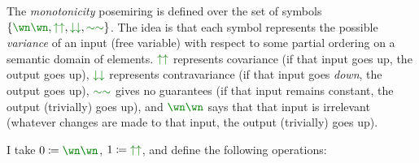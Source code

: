 \begin{example}\label{def:monotonicity-posemiring}
  The \emph{monotonicity} posemiring is defined over the set of symbols
  $\{\gr{\wn\wn}, \gr{\uparrow\uparrow}, \gr{\downarrow\downarrow},
  \gr{\sim\sim}\}$.
  The idea is that each symbol represents the possible \emph{variance} of an
  input (free variable) with respect to some partial ordering on a semantic
  domain of elements.
  $\gr{\uparrow\uparrow}$ represents covariance (if that input goes up, the
  output goes up), $\gr{\downarrow\downarrow}$ represents contravariance
  (if that input goes \emph{down}, the output goes up), $\gr{\sim\sim}$ gives no
  guarantees (if that input remains constant, the output (trivially) goes up),
  and $\gr{\wn\wn}$ says that that input is irrelevant (whatever changes are
  made to that input, the output (trivially) goes up).

  I take $0 \coloneqq \gr{\wn\wn}$, $1 \coloneqq \gr{\uparrow\uparrow}$,
  and define the following operations:

\end{example}
